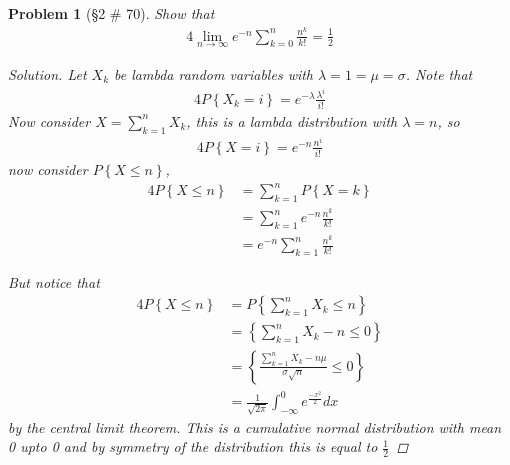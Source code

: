 \documentclass[11pt, oneside]{book}   	%
\newtheorem{problem}{Problem}[chapter]
\newcommand{\set}[1]{\left\{#1\right\}}
\begin{document}
\begin{problem}[\S 2 \# 70]
	Show that 
	\begin{alignat}{4}
		\lim_{n\to\infty}e^{-n}\sum_{k=0}^n\frac{n^k}{k!}=\frac{1}{2}
	\end{alignat}
	\begin{proof}[Solution]
		Let $X_k$ be lambda random variables with $\lambda=1=\mu=\sigma$. Note that 
		\begin{alignat}{4}
			P\set{X_k=i}=e^{-\lambda} \frac{\lambda^i}{i!}
		\end{alignat}
		Now consider $X=\sum_{k=1}^n X_k$, this is a lambda distribution with $\lambda = n$, so 
		\begin{alignat}{4}
			P\set{X=i}=e^{-n}\frac{n^i}{i!}
		\end{alignat}
		now consider $P\set{X\leq n}$,
		\begin{alignat}{4}
			P\set{X\leq n}&=\sum_{k=1}^nP\set{X=k} \\
				&=\sum_{k=1}^ne^{-n}\frac{n^k}{k!} \\
				&=e^{-n}\sum_{k=1}^n\frac{n^k}{k!}
		\end{alignat}
		
		But notice that
		\begin{alignat}{4}
			P\set{X\leq n}&=P\set{\sum_{k=1}^n X_k \leq n} \\
				&=\set{\sum_{k=1}^nX_k -n \leq 0} \\
				&=\set{\frac{\sum_{k=1}^n X_k -n\mu}{\sigma\sqrt{n}}\leq 0} \\
				&=\frac{1}{\sqrt{2\pi}}\int_{-\infty}^0 e^{\frac{-x^2}{2}} dx
		\end{alignat}
		by the central limit theorem. This is a cumulative normal distribution with mean 0 upto 0 and by symmetry of the distribution this is equal to $\frac{1}{2}$
	\end{proof}
\end{problem}
\end{document}
